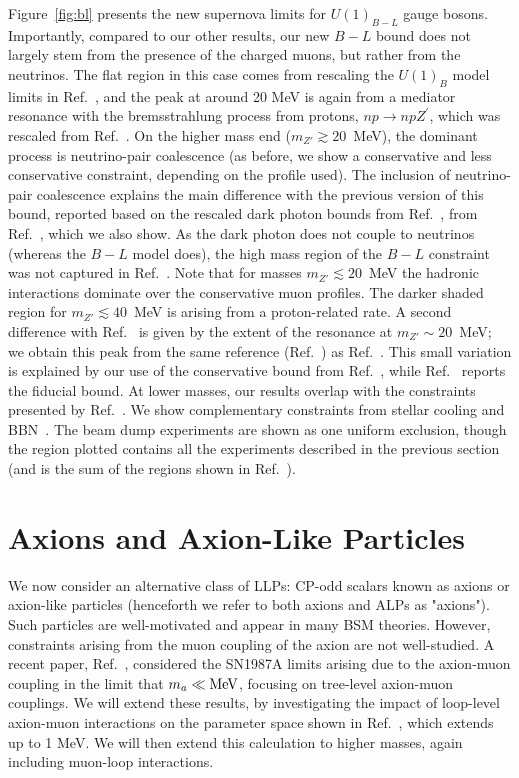 \documentclass[11pt]{article}
\begin{document}
Figure~\ref{fig:bl} presents the new supernova limits for $U(1)_{B-L}$ gauge bosons.
Importantly, compared to our other results, our new $B-L$ bound does not largely stem from the presence of the charged muons, but rather from the neutrinos. 
%
The flat region in this case comes from rescaling the $U(1)_B$ model limits in Ref.~\cite{Rrapaj:2015wgs}, and the peak at around 20 MeV is again from a mediator resonance with the bremsstrahlung process from protons, $np\rightarrow np Z^\prime$, which was rescaled from Ref.~\cite{Chang:2016ntp}. 
On the higher mass end ($m_{Z'}\gtrsim20$~MeV), the dominant process is neutrino-pair coalescence (as before, we show a conservative and less conservative constraint, depending on the profile used). The inclusion of neutrino-pair coalescence explains the main difference with the previous version of this bound, reported based on the rescaled dark photon bounds from Ref.~\cite{Chang:2016ntp}, from Ref.~\cite{Knapen:2017xzo}, which we also show. As the dark photon does not couple to neutrinos (whereas the $B-L$ model does), the high mass region of the $B-L$ constraint was not captured in Ref.~\cite{Knapen:2017xzo}. Note that for masses $m_{Z'}\lesssim 20$~MeV the hadronic interactions dominate over the conservative muon profiles. The darker shaded region for $m_{Z'}\lesssim40$~MeV is arising from a proton-related rate.
A second difference with Ref.~\cite{Knapen:2017xzo} is given by the extent of the resonance at $m_{Z'} \sim 20$~MeV; we obtain this peak from the same reference (Ref.~\cite{Chang:2016ntp}) as Ref.~\cite{Knapen:2017xzo}. This small variation is explained by our use of the conservative bound from Ref.~\cite{Chang:2016ntp}, while Ref.~\cite{Knapen:2017xzo} reports the fiducial bound. At lower masses, our results overlap with the constraints presented by Ref.~\cite{Knapen:2017xzo}. 
We show complementary constraints from stellar cooling and BBN~\cite{Knapen:2017xzo}. The beam dump experiments are shown as one uniform exclusion, though the region plotted contains all the experiments described in the previous section (and is the sum of the regions shown in Ref.~\cite{Bauer:2018onh}).


\newpage
\section{Axions and Axion-Like Particles}
\label{sec:axions}

We now consider an alternative class of LLPs: CP-odd scalars known as axions or axion-like particles (henceforth we refer to both axions and ALPs as "axions"). Such particles are well-motivated and appear in many BSM theories. However, constraints arising from the muon coupling of the axion are not well-studied. A recent paper,
Ref.~\cite{Bollig:2020xdr}, considered the SN1987A limits arising due to the axion-muon coupling in the limit that $m_a \ll \operatorname{MeV}$, focusing on tree-level axion-muon couplings. We will extend these results, by investigating the impact of loop-level axion-muon interactions on the parameter space shown in Ref.~\cite{Bollig:2020xdr}, which extends up to 1 MeV. We will then extend this calculation to higher masses, again including muon-loop interactions.
\end{document}
